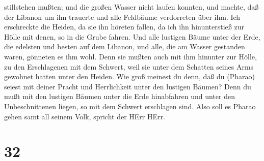 stillstehen mußten; und die großen Wasser nicht laufen konnten, und
machte, daß der Libanon um ihn trauerte und alle Feldbäume verdorreten
über ihm.  Ich erschreckte die Heiden, da sie ihn höreten
fallen, da ich ihn hinunterstieß zur Hölle mit denen, so in die Grube
fahren. Und alle lustigen Bäume unter der Erde, die edelsten und besten
auf dem Libanon, und alle, die am Wasser gestanden waren, gönneten es
ihm wohl.  Denn sie mußten auch mit ihm hinunter zur Hölle,
zu den Erschlagenen mit dem Schwert, weil sie unter dem Schatten seines
Arms gewohnet hatten unter den Heiden.  Wie groß meinest du
denn, daß du (Pharao) seiest mit deiner Pracht und Herrlichkeit unter
den lustigen Bäumen? Denn du mußt mit den lustigen Bäumen unter die Erde
hinabfahren und unter den Unbeschnittenen liegen, so mit dem Schwert
erschlagen sind. Also soll es Pharao gehen samt all seinem Volk, spricht
der HErr HErr.

\hypertarget{section-31}{%
\section{32}\label{section-31}}

